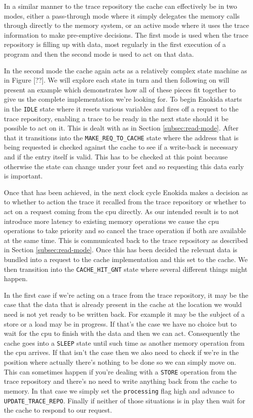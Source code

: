 In a similar manner to the trace repository the cache can effectively be in two modes, either a pass-through mode where it simply delegates the memory calls through directly to the memory system, or an active mode where it uses the trace information to make pre-emptive decisions. The first mode is used when the trace repository is filling up with data, most regularly in the first execution of a program and then the second mode is used to act on that data. 

In the second mode the cache again acts as a relatively complex state machine as in Figure [??]. We will explore each state in turn and then following on will present an example which demonstrates how all of these pieces fit together to give us the complete implementation we're looking for. To begin Enokida starts in the \texttt{IDLE} state where it resets various variables and fires off a request to the trace repository, enabling a trace to be ready in the next state should it be possible to act on it. This is dealt with as in Section \ref{subsec:read-mode}. After that it transitions into the \texttt{MAKE\_REQ\_TO\_CACHE} state where the address that is being requested is checked against the cache to see if a write-back is necessary and if the entry itself is valid. This has to be checked at this point because otherwise the state can change under your feet and so requesting this data early is important. 

Once that has been achieved, in the next clock cycle Enokida makes a decision as to whether to action the trace it recalled from the trace repository or whether to act on a request coming from the \gls{cpu} directly. As our intended result is to not introduce more latency to existing memory operations we cause the \gls{cpu} operations to take priority and so cancel the trace operation if both are available at the same time. This is communicated back to the trace repository as described in Section \ref{subsec:read-mode}. Once this has been decided the relevant data is bundled into a request to the cache implementation and this set to the cache. We then transition into the \texttt{CACHE\_HIT\_GNT} state where several different things might happen. 

In the first case if we're acting on a trace from the trace repository, it may be the case that the data that is already present in the cache at the location we would need is not yet ready to be written back. For example it may be the subject of a store or a load may be in progress. If that's the case we have no choice but to wait for the \gls{cpu} to finish with the data and then we can act. Consequently the cache goes into a \texttt{SLEEP} state until such time as another memory operation from the \gls{cpu} arrives. If that isn't the case then we also need to check if we're in the position where actually there's nothing to be done so we can simply move on. This can sometimes happen if you're dealing with a \texttt{STORE} operation from the trace repository and there's no need to write anything back from the cache to memory. In that case we simply set the \texttt{processing} flag high and advance to \texttt{UPDATE\_TRACE\_REPO}. Finally if neither of those situations is in play then wait for the cache to respond to our request.

